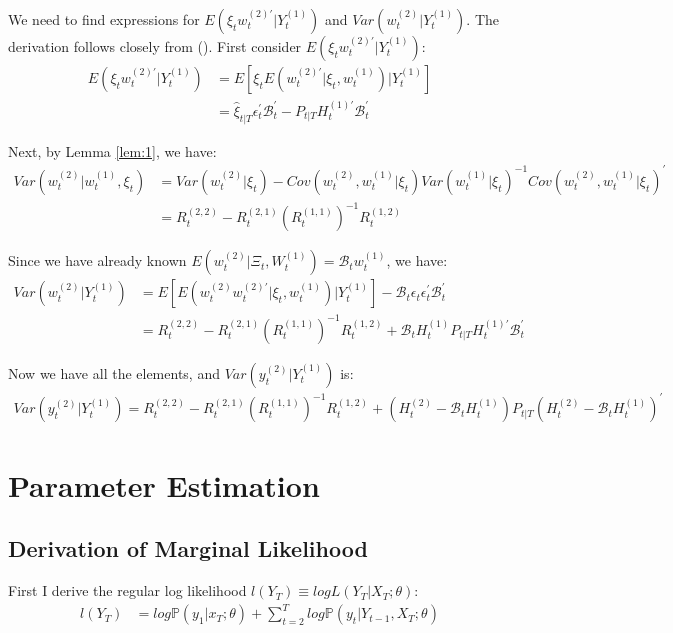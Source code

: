 \documentclass[10pt, titlepage]{article}
\numberwithin{equation}{section}
\begin{document}
We need to find expressions for $E(\xi_tw_t^{(2)'}|Y_t^{(1)})$ and $Var(w_t^{(2)}|Y_t^{(1)})$. The derivation follows closely from (\cite{shumway_2000}). First consider $E(\xi_tw_t^{(2)'}|Y_t^{(1)})$:
\begin{align*}
    E(\xi_tw_t^{(2)'}|Y_t^{(1)}) &= E\left[\xi_tE\left(w_t^{(2)'}|\xi_t, w_t^{(1)}\right)|Y_t^{(1)}\right] \\
    &= \hat{\xi}_{t|T}\epsilon_t^{'}\mathcal{B}_t^{'} - P_{t|T}H_t^{(1)'}\mathcal{B}_t^{'}
\end{align*}

Next, by Lemma \ref{lem:1}, we have:
\begin{align*}
    Var(w_t^{(2)}|w_t^{(1)}, \xi_t) &= Var(w_t^{(2)}|\xi_t) - Cov(w_t^{(2)}, w_t^{(1)}|\xi_t)Var(w_t^{(1)}|\xi_t)^{-1}
        Cov(w_t^{(2)}, w_t^{(1)}|\xi_t)^{'} \\
    &= R_t^{(2, 2)} - R_t^{(2, 1)}\left(R_t^{(1, 1)}\right)^{-1}R_t^{(1, 2)}
\end{align*}

Since we have already known $E(w_t^{(2)}|\Xi_t, W_t^{(1)})=\mathcal{B}_tw_t^{(1)}$, we have:
\begin{align*}
    Var(w_t^{(2)}|Y_t^{(1)}) &= E\left[E\left(w_t^{(2)}w_t^{(2)'}|\xi_t,w_t^{(1)}\right)|Y_t^{(1)}\right] - \mathcal{B}_t\epsilon_t
        \epsilon_t^{'}\mathcal{B}_t^{'} \\
    &= R_t^{(2, 2)} - R_t^{(2, 1)}\left(R_t^{(1, 1)}\right)^{-1}R_t^{(1, 2)} + \mathcal{B}_tH_t^{(1)}P_{t|T}H_t^{(1)'}\mathcal{B}_t^{'}
\end{align*}

Now we have all the elements, and $Var(y_t^{(2)}|Y_t^{(1)})$ is:
\begin{align}
    Var(y_t^{(2)}|Y_t^{(1)}) = R_t^{(2, 2)} - R_t^{(2, 1)}\left(R_t^{(1, 1)}\right)^{-1}R_t^{(1, 2)} + 
        \left(H_t^{(2)}-\mathcal{B}_tH_t^{(1)}\right)P_{t|T}\left(H_t^{(2)}-\mathcal{B}_tH_t^{(1)}\right)^{'} 
\end{align}

\section{Parameter Estimation}
\subsection{Derivation of Marginal Likelihood} \label{ap:NL}
First I derive the regular log likelihood $l(Y_T)\equiv logL(Y_T|X_T;\theta)$: 
\begin{align*}
    l(Y_T) &= log\mathbb{P}(y_1|x_T;\theta) + \sum_{t=2}^Tlog\mathbb{P}(y_t|Y_{t-1},X_T;\theta)
\end{align*}
\end{document}
